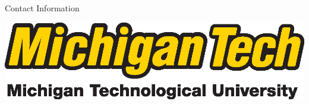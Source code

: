 \documentclass[final]{beamer}
\newlength{\onecolwid}
\begin{document}
\begin{frame}[t]
\begin{columns}[t]
\begin{column}{\onecolwid}
\begin{block}{Contact Information}
\end{block}

\begin{center}
\includegraphics[width=0.4\linewidth]{logo_withfullname_LG.eps}
\end{center}


\end{column} %

\end{columns} %

\end{frame} %
\end{document}
